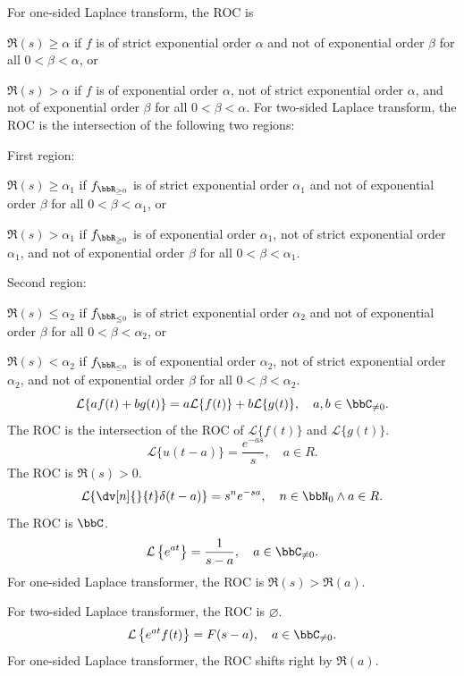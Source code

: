 \documentclass[a4paper,12pt]{article}
\begin{document}
For one-sided Laplace transform, the ROC is
\bit
\item $\Re(s)\geq\alpha$ if $f$ is of strict exponential order $\alpha$ and not of exponential order $\beta$ for all $0<\beta<\alpha$, or
\item $\Re(s)>\alpha$ if $f$ is of exponential order $\alpha$, not of strict exponential order $\alpha$, and not of exponential order $\beta$ for all $0<\beta<\alpha$.
\eit
For two-sided Laplace transform, the ROC is the intersection of the following two regions:
\bit
\item First region:
\bit
\item $\Re(s)\geq\alpha_1$ if $f_{\bbR_{\geq0}}$ is of strict exponential order $\alpha_1$ and not of exponential order $\beta$ for all $0<\beta<\alpha_1$, or
\item $\Re(s)>\alpha_1$ if $f_{\bbR_{\geq0}}$ is of exponential order $\alpha_1$, not of strict exponential order $\alpha_1$, and not of exponential order $\beta$ for all $0<\beta<\alpha_1$.
\eit
\item Second region:
\bit
\item $\Re(s)\leq\alpha_2$ if $f_{\bbR_{\leq0}}$ is of strict exponential order $\alpha_2$ and not of exponential order $\beta$ for all $0<\beta<\alpha_2$, or
\item $\Re(s)<\alpha_2$ if $f_{\bbR_{\leq0}}$ is of exponential order $\alpha_2$, not of strict exponential order $\alpha_2$, and not of exponential order $\beta$ for all $0<\beta<\alpha_2$.
\eit
\eit
{}
\[\mathcal{L}\{af(t)+bg(t)\}=a\mathcal{L}\{f(t)\}+b\mathcal{L}\{g(t)\},\quad a,b\in\bbC_{\neq0}.\]
The ROC is the intersection of the ROC of $\mathcal{L}\{f(t)\}$ and $\mathcal{L}\{g(t)\}$.
\[\mathcal{L}\{u(t-a)\} = \frac{e^{-as}}{s},\quad a\in R.\]
The ROC is $\Re(s)>0$.
\[\mathcal{L}\{\dv[n]{}{t}\delta(t-a)\}=s^ne^{-sa},\quad n\in\bbN_0\land a\in R.\]
The ROC is $\bbC$.
\[\mathcal{L}\left\{e^{at}\right\} = \frac{1}{s-a},\quad a\in\bbC_{\neq0}.\]
For one-sided Laplace transformer, the ROC is $\Re(s)>\Re(a)$.

For two-sided Laplace transformer, the ROC is $\varnothing$.
\[\mathcal{L}\left\{e^{at}f(t)\right\}=F(s-a),\quad a\in\bbC_{\neq0}.\]
For one-sided Laplace transformer, the ROC shifts right by $\Re(a)$.
\end{document}
